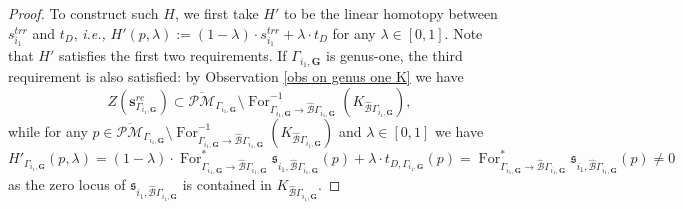 \documentclass[11pt]{amsart}
\theoremstyle{definition}
\theoremstyle{remark}
\newcommand{\oPMb}{{\overline{\mathcal{PM}}}}
\newcommand{\<}{\left<}
\renewcommand{\>}{\right>}
\numberwithin{equation}{section}
\begin{document}
\begin{proof}
        To construct such $H$, we first take $H'$ to be the linear homotopy between $s^{trr}_{i_1}$ and $t_D$, \textit{i.e.,} $H'(p,\lambda):=(1-\lambda)\cdot s^{trr}_{i_1}+\lambda \cdot t_D$ for any $\lambda\in [0,1]$. Note that $H'$ satisfies the first two requirements. If $\Gamma_{i_1,\bm{G}}$ is genus-one, the third requirement is also satisfied: by Observation \ref{obs on genus one K} we have 
        $$Z\left(\bm{s}^{re}_{\Gamma_{i_1,\bm{G}}}\right)\subset \oPMb_{\Gamma_{i_1,\bm{G}}}\setminus \operatorname{For}^{-1}_{\Gamma_{i_1,\bm{G}} \to \hat{\mathcal B}\Gamma_{i_1,\bm{G}}} \left(K_{\hat{\mathcal B}\Gamma_{i_1,\bm{G}}}\right),$$
        while for any $p\in \oPMb_{\Gamma_{i_1,\bm{G}}}\setminus \operatorname{For}^{-1}_{\Gamma_{i_1,\bm{G}} \to \hat{\mathcal B}\Gamma_{i_1,\bm{G}}} \left(K_{\hat{\mathcal B}\Gamma_{i_1,\bm{G}}}\right)$ and $\lambda\in [0,1]$ we have $$H'_{\Gamma_{i_1,\bm{G}}}(p,\lambda)=(1-\lambda)\cdot \operatorname{For}^*_{\Gamma_{i_1,\bm{G}} \to \hat{\mathcal B}\Gamma_{i_1,\bm{G}}} \mathfrak s_{i_1,\hat{\mathcal B}\Gamma_{i_1,\bm{G}}}(p) +\lambda \cdot t_{D,\Gamma_{i_1,\bm{G}}}(p)=\operatorname{For}^*_{\Gamma_{i_1,\bm{G}} \to \hat{\mathcal B}\Gamma_{i_1,\bm{G}}} \mathfrak s_{i_1,\hat{\mathcal B}\Gamma_{i_1,\bm{G}}}(p)\ne 0$$
        as the zero locus of $\mathfrak s_{i_1,\hat{\mathcal B}\Gamma_{i_1,\bm{G}}}$ is contained %
in $K_{\hat{\mathcal B}\Gamma_{i_1,\bm{G}}}$. %


\end{proof}
\end{document}

